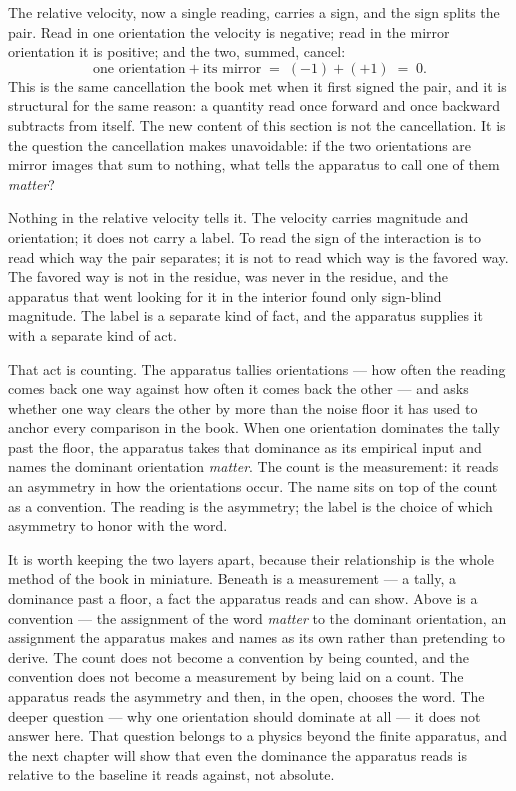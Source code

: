 The relative velocity, now a single reading, carries a sign, and the sign splits the pair. Read in
one orientation the velocity is negative; read in the mirror orientation it is positive; and the
two, summed, cancel:
\[
  \text{one orientation} + \text{its mirror} \;=\; (-1) + (+1) \;=\; 0.
\]
This is the same cancellation the book met when it first signed the pair, and it is structural for
the same reason: a quantity read once forward and once backward subtracts from itself. The new
content of this section is not the cancellation. It is the question the cancellation makes
unavoidable: if the two orientations are mirror images that sum to nothing, what tells the
apparatus to call one of them \emph{matter}?

Nothing in the relative velocity tells it. The velocity carries magnitude and orientation; it does
not carry a label. To read the sign of the interaction is to read which way the pair separates; it
is not to read which way is the favored way. The favored way is not in the residue, was never in
the residue, and the apparatus that went looking for it in the interior found only sign-blind
magnitude. The label is a separate kind of fact, and the apparatus supplies it with a separate kind
of act.

That act is counting. The apparatus tallies orientations --- how often the reading comes back one
way against how often it comes back the other --- and asks whether one way clears the other by more
than the noise floor it has used to anchor every comparison in the book. When one orientation
dominates the tally past the floor, the apparatus takes that dominance as its empirical input and
names the dominant orientation \emph{matter}. The count is the measurement: it reads an asymmetry
in how the orientations occur. The name sits on top of the count as a convention. The reading is
the asymmetry; the label is the choice of which asymmetry to honor with the word.

It is worth keeping the two layers apart, because their relationship is the whole method of the
book in miniature. Beneath is a measurement --- a tally, a dominance past a floor, a fact the
apparatus reads and can show. Above is a convention --- the assignment of the word \emph{matter} to
the dominant orientation, an assignment the apparatus makes and names as its own rather than
pretending to derive. The count does not become a convention by being counted, and the convention
does not become a measurement by being laid on a count. The apparatus reads the asymmetry and then,
in the open, chooses the word. The deeper question --- why one orientation should dominate at
all --- it does not answer here. That question belongs to a physics beyond the finite apparatus,
and the next chapter will show that even the dominance the apparatus reads is relative to the
baseline it reads against, not absolute.

